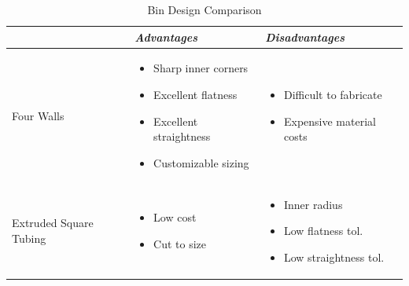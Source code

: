\documentclass[11pt]{article}
\begin{document}
\begin{table}[htb!]
\caption{Bin Design Comparison}
\label{tab:binDesign}
\begin{center}
\begin{tabular}{ p{2.5cm} || p{5cm} | p{5cm} }
& \textit{\textbf{Advantages}} & \textit{\textbf{Disadvantages}} \\
\hline
\hline

Four Walls &  
\begin{minipage}[t]{1\textwidth}
	\begin{itemize}
	\setlength\itemsep{-.25em}
	\item Sharp inner corners
	\item Excellent flatness
	\item Excellent straightness
	\item Customizable sizing
	\vspace{.2cm}
	\end{itemize}
\end{minipage} & 
\begin{minipage}[t]{1\textwidth}
	\begin{itemize}
	\setlength\itemsep{-.25em}
	\item Difficult to fabricate 
	\item Expensive material costs
	\end{itemize}
\end{minipage} \\

\hline

Extruded Square Tubing &  
\begin{minipage}[t]{1\textwidth}
	\begin{itemize}
	\setlength\itemsep{-.25em}
	\item Low cost
	\item Cut to size
	\end{itemize}
\end{minipage} & 
\begin{minipage}[t]{1\textwidth}
	\begin{itemize}
	\setlength\itemsep{-.25em}
	\item Inner radius
	\item Low flatness tol.
	\item Low straightness tol.
	\vspace{.2cm}
	\end{itemize}

\end{minipage} \\
\end{tabular}
\end{center}
\end{table}
\end{document}
